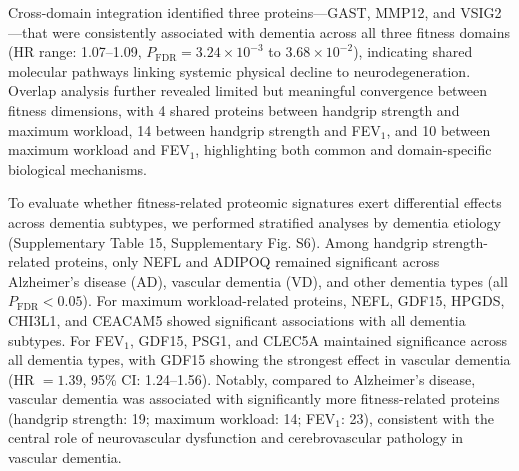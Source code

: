 \documentclass{article}
\begin{document}
Cross-domain integration identified three proteins—GAST, MMP12, and VSIG2—that were consistently associated with dementia across all three fitness domains (HR range: 1.07--1.09, $P_{\text{FDR}} = 3.24 \times 10^{-3}$ to $3.68 \times 10^{-2}$), indicating shared molecular pathways linking systemic physical decline to neurodegeneration. Overlap analysis further revealed limited but meaningful convergence between fitness dimensions, with 4 shared proteins between handgrip strength and maximum workload, 14 between handgrip strength and FEV$_1$, and 10 between maximum workload and FEV$_1$, highlighting both common and domain-specific biological mechanisms.

To evaluate whether fitness-related proteomic signatures exert differential effects across dementia subtypes, we performed stratified analyses by dementia etiology (Supplementary Table 15, Supplementary Fig. S6). Among handgrip strength-related proteins, only NEFL and ADIPOQ remained significant across Alzheimer's disease (AD), vascular dementia (VD), and other dementia types (all $P_{\text{FDR}} < 0.05$). For maximum workload-related proteins, NEFL, GDF15, HPGDS, CHI3L1, and CEACAM5 showed significant associations with all dementia subtypes. For FEV$_1$, GDF15, PSG1, and CLEC5A maintained significance across all dementia types, with GDF15 showing the strongest effect in vascular dementia (HR $= 1.39$, 95\% CI: 1.24--1.56). Notably, compared to Alzheimer's disease, vascular dementia was associated with significantly more fitness-related proteins (handgrip strength: 19; maximum workload: 14; FEV$_1$: 23), consistent with the central role of neurovascular dysfunction and cerebrovascular pathology in vascular dementia.
\end{document}
